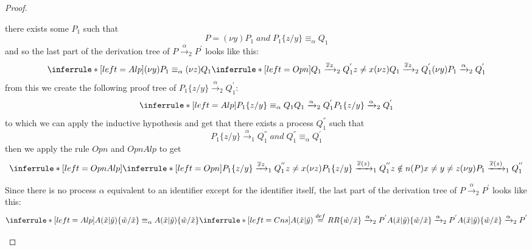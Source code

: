 \begin{theorem}
\begin{proof}
\begin{description}
\begin{description}
\begin{itemize}
		there exists some $P_{1}$ such that 
		\[
		  P=(\nu y)P_{1}\; and\; P_{1}\{z/y\}\equiv_{\alpha}Q_{1}
		\]
		and so the last part of the derivation tree of $P\xrightarrow{\alpha}_{2}P^{'}$ looks like this:
		\[
		  \inferrule* [left=Alp]{
		      (\nu y)P_{1}\equiv_{\alpha}(\nu z)Q_{1}
		    \\
		      \inferrule* [left=Opn]{
			  Q_{1}\xrightarrow{\overline{x}z}_{2}Q_{1}^{'}
			\\
			  z\neq x
		      }{
			(\nu z)Q_{1}\xrightarrow{\overline{x}z}_{2}Q_{1}^{'}
		      }
		  }{
		    (\nu y)P_{1}\xrightarrow{\alpha}_{2}Q_{1}^{'}
		  }
		\]
		from this we create the following proof tree of $P_{1}\{z/y\}\xrightarrow{\alpha}_{2}Q_{1}^{'}$:
		\[
		  \inferrule* [left=Alp]{
		      P_{1}\{z/y\}\equiv_{\alpha}Q_{1}
		    \\
		      Q_{1}\xrightarrow{\alpha}_{2}Q_{1}^{'}
		  }{
		    P_{1}\{z/y\}\xrightarrow{\alpha}_{2}Q_{1}^{'}
		  }		
		\]
		to which we can apply the inductive hypothesis and get that there exists a process $Q_{1}^{''}$ such that
		\[
		  P_{1}\{z/y\}\xrightarrow{\alpha}_{1}Q_{1}^{''}\;and\; Q_{1}^{''}\equiv_{\alpha}Q_{1}^{'}
		\]
		then we apply the rule $Opn$ and $OpnAlp$ to get
		\[
		  \inferrule* [left=OpnAlp]{
		      \inferrule* [left=Opn]{
			  P_{1}\{z/y\} \xrightarrow{\overline{x}z}_{1}Q_{1}^{''}
			\\
			  z\neq x
		      }{
			(\nu z)P_{1}\{z/y\} \xrightarrow{\overline{x}(z)}_{1}Q_{1}^{''}
		      }
		    \\
		      z\notin n(P)
		    \\
		      x\neq y\neq z
		  }{
		    (\nu y)P_{1} \xrightarrow{\overline{x}(z)}_{1}Q_{1}^{''}
		  }
		\]
	    \end{itemize}
	  \item[Cns]
	    Since there is no process $\alpha$ equivalent to an identifier except for the identifier itself, the last part of the derivation tree of $P\xrightarrow{\alpha}_{2}P^{'}$ looks like this:
 		\[
 		  \inferrule* [left=Alp]{
 		      A(\tilde{x}|\tilde{y})\{\tilde{w}/\tilde{x}\}\equiv_{\alpha}A(\tilde{x}|\tilde{y})\{\tilde{w}/\tilde{x}\}
 		    \\
 		      \inferrule* [left=Cns]{
 			  A(\tilde{x}|\tilde{y})\stackrel{def}{=}R
 			\\
 			  R\{\tilde{w}/\tilde{x}\}\xrightarrow{\alpha}_{2}P^{'}
 		      }{
 			A(\tilde{x}|\tilde{y})\{\tilde{w}/\tilde{x}\}\xrightarrow{\alpha}_{2}P^{'}
 		      }
 		  }{
 		    A(\tilde{x}|\tilde{y})\{\tilde{w}/\tilde{x}\}\xrightarrow{\alpha}_{2}P^{'}
}\]
\end{description}
\end{description}
\end{proof}
\end{theorem}
